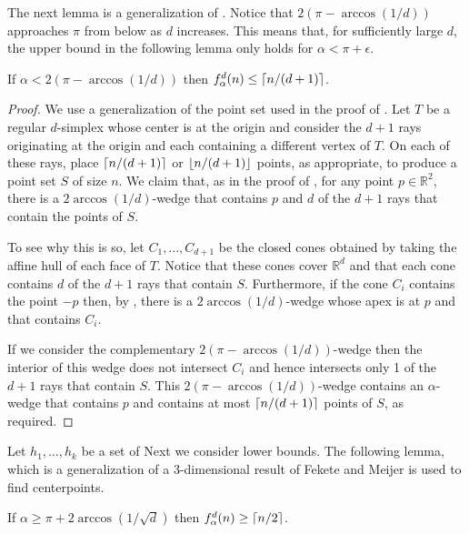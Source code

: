 \documentclass[lotsofwhite]{patmorin}
\begin{document}
The next lemma is a generalization of .  Notice that
$2(\pi-\arccos(1/d))$ approaches $\pi$ from below as $d$ increases.  This
means that, for sufficiently large $d$, the upper bound in the
following lemma only holds for $\alpha < \pi+\epsilon$.

\begin{lem}
If $\alpha < 2(\pi-\arccos(1/d))$ then $f^d_\alpha(n) \le \left\lceil n/(d+1) \right\rceil$.
\end{lem}

\begin{proof} 
We use a generalization of the point set used in the proof of
.  Let $T$ be a regular $d$-simplex whose center is at the
origin and consider the $d+1$ rays originating at the origin and each
containing a different vertex of $T$.  On each of these rays, place
$\left\lceil n/(d+1) \right\rceil$ or $\left\lfloor n/(d+1) \right\rfloor$ points, as appropriate, to
produce a point set $S$ of size $n$.  We claim that, as in the proof
of , for any point $p\in\mathbb{R}^2$, there is a
$2\arccos(1/d)$-wedge that contains $p$ and $d$ of the $d+1$ rays that
contain the points of $S$. 

To see why this is so, let $C_1,\ldots,C_{d+1}$ be the closed cones
obtained by taking the affine hull of each face of $T$.  Notice that
these cones cover $\mathbb{R}^d$ and that each cone contains $d$ of
the $d+1$ rays that contain $S$.  Furthermore, if the cone $C_i$
contains the point $-p$ then, by , there is a
$2\arccos(1/d)$-wedge whose apex is at $p$ and that contains $C_i$.  

If we consider the complementary $2(\pi-\arccos(1/d))$-wedge then the
interior of this wedge does not intersect $C_i$ and hence intersects
only 1 of the $d+1$ rays that contain $S$. This
$2(\pi-\arccos(1/d))$-wedge contains an $\alpha$-wedge that contains $p$
and contains at most $\left\lceil n/(d+1) \right\rceil$ points of $S$, as required.
\end{proof}

Let $h_1,\ldots,h_k$ be a set of 
Next we consider lower bounds.  The following lemma, which is a
generalization of a 3-dimensional result of Fekete and Meijer
\cite{fm00}
is used to find centerpoints.


\begin{lem}
If $\alpha \ge \pi+2\arccos(1/\sqrt{d})$ then $f_\alpha^d(n)\ge \left\lceil n/2 \right\rceil$.
\end{lem}
\end{document}
